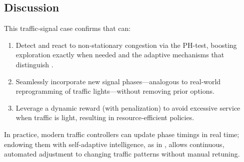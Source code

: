 \subsection{Discussion}
This traffic‐signal case confirms that \adaptiverl can:
\begin{enumerate}
  \item Detect and react to non-stationary congestion via the PH-test, boosting exploration exactly when needed and the adaptive mechanisms that distinguish \adaptiverl.
  \item Seamlessly incorporate new signal phases—analogous to real‐world reprogramming of traffic lights—without removing prior options.
  \item Leverage a dynamic reward (with penalization) to avoid excessive service when traffic is light, resulting in resource‐efficient policies.
\end{enumerate}
In practice, modern traffic controllers can update phase timings in real time; endowing them with self-adaptive intelligence, as in \adaptiverl, allows continuous, automated adjustment to changing traffic patterns without manual retuning.

\endinput

